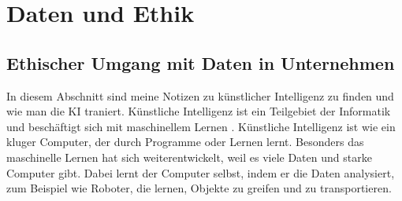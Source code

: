 \section{Daten und Ethik}
\label{sec:ai}
\subsection{Ethischer Umgang mit Daten in Unternehmen}

In diesem Abschnitt sind meine Notizen zu künstlicher Intelligenz zu finden und wie man die KI traniert.
\newline
Künstliche Intelligenz ist ein Teilgebiet der Informatik und beschäftigt sich mit maschinellem Lernen \citep{ai-wikipedia}.
\newline
Künstliche Intelligenz ist wie ein kluger Computer, der durch Programme oder Lernen lernt. Besonders das maschinelle Lernen hat sich weiterentwickelt, weil es viele Daten und starke Computer gibt. Dabei lernt der Computer selbst, indem er die Daten analysiert, zum Beispiel wie Roboter, die lernen, Objekte zu greifen und zu transportieren.